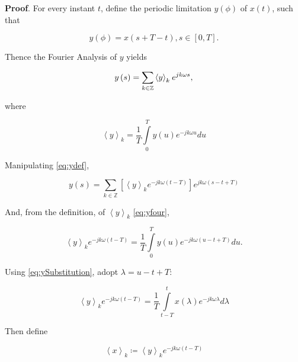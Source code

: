 \textbf{Proof}. For every instant $t$, define the periodic limitation $y\left(\phi\right)$ of $x(t)$, such that

\begin{equation} y\left(\phi\right) = x\left(s + T - t\right), s\in\left[0,T\right]. \label{eq:ySubstitution} \end{equation}

        Thence the Fourier Analysis of $y$ yields

\begin{equation} y\left(s\right) = \sum\limits_{k\in\mathbb{Z}} \left\langle y \right\rangle_k\hspace{-1mm} \ e^{jk\omega s}, \label{eq:ydef} \end{equation}

where

\begin{equation} \left\langle y \right\rangle_k = \dfrac{1}{T}\int\limits_{0}^{T}y\left(u\right) e^{-jk\omega u}d u \label{eq:yfour} \end{equation}

        Manipulating \eqref{eq:ydef},

\begin{equation} y\left(s\right) = \sum\limits_{k\in\mathbb{Z}} \left[\left\langle y \right\rangle_ke^{-jk\omega\left(t-T\right)}\right] e^{jk\omega\left(s - t + T\right)} \end{equation}

        And, from the definition, of $\left\langle y \right\rangle_k$ \eqref{eq:yfour},

\begin{equation} \left\langle y \right\rangle_k e^{-jk\omega\left(t-T\right)} = \dfrac{1}{T}\int\limits_{0}^{T}y\left(u\right) e^{-jk\omega\left(u - t +T\right)}du .\end{equation}

        Using \eqref{eq:ySubstitution}, adopt $\lambda = u - t + T$:

\begin{equation} \left\langle y \right\rangle_k e^{-jk\omega\left(t-T\right)} = \dfrac{1}{T}\int\limits_{t-T}^{t}x\left(\lambda\right) e^{-jk\omega\lambda}d\lambda \label{eq:ySubs2} \end{equation}

        Then define

\begin{equation} \left\langle x \right\rangle_k \coloneqq \left\langle y \right\rangle_ke^{-jk\omega\left(t-T\right)} \label{eq:ySubs3} \end{equation}

